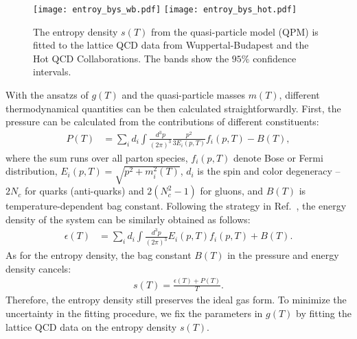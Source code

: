 \documentclass[aps,superscriptaddress,prc,twocolumn,nofootinbib]{revtex4}
\begin{document}
\begin{figure*}[tbh]
\texttt{[image: entroy\_bys\_wb.pdf]}
\texttt{[image: entroy\_bys\_hot.pdf]}
\caption{The entropy density $s(T)$ from the quasi-particle model (QPM) is fitted to the lattice QCD data from Wuppertal-Budapest \cite{Borsanyi:2013bia} and the Hot QCD \cite{Bazavov:2014pvz} Collaborations. The bands show the $95\%$ confidence intervals.}
	\label{entropy-density}
\end{figure*}


With the ansatzs of $g(T)$ and the quasi-particle masses $m(T)$,  different thermodynamical quantities can be then calculated straightforwardly. First, the pressure can be calculated from the contributions of different constituents:
\begin{align}
  \label{eq:boltzmann1}
  P(T) &=\sum_{i} d_i \int \frac{d^3 p}{(2 \pi)^3}
  \frac{p^2}{3 E_i(p, T)} f_i(p, T)-B(T),
\end{align}
where the sum runs over all parton species, $f_i(p, T)$ denote Bose or Fermi distribution, $E_i(p, T) = \sqrt{p^2 + m_i^2(T)}$, $d_i$ is the spin and color degeneracy -- $2N_c$ for quarks (anti-quarks) and $2(N_c^2 - 1)$ for gluons, and $B(T)$ is temperature-dependent bag constant.
Following the strategy in Ref.~\cite{Plumari:2011mk}, the energy density of the system can be similarly obtained as follows:
\begin{align}
  \epsilon(T) &=\sum_{i} d_i \int \frac{d^3 p}{(2\pi)^3}E_i(p, T) f_i(p, T)+B(T).
\end{align}
As for the entropy density, the bag constant $B(T)$ in the pressure and energy density cancels:
\begin{align}
s(T) = \frac{\epsilon(T) + P(T)}{T}.
\end{align}
Therefore, the entropy density still preserves the ideal gas form. To minimize the uncertainty in the fitting procedure, we fix the parameters in $g(T)$ by fitting the lattice QCD data on the entropy density $s(T)$.
\end{document}
